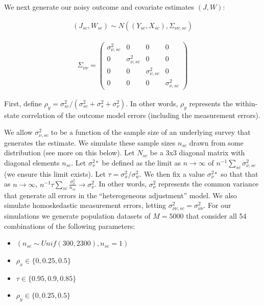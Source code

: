 We next generate our noisy outcome and covariate estimates $(J, W)$:

\begin{align*}
(J_{sc}, W_{sc}) \sim N((Y_{sc}, X_{sc}), \Sigma_{\nu\nu, sc})
\end{align*}

\begin{align*}
    \Sigma_{\nu\nu} = \begin{pmatrix}
    \sigma^2_{\nu, sc} & 0 & 0 & 0 \\
    0 & \sigma^2_{\nu, sc} & 0 & 0 \\
    0 & 0 & \sigma^2_{\nu, sc} & 0 \\
    0 & 0 & 0 & \sigma^2_{\nu, sc}
    \end{pmatrix}
\end{align*}

First, define $\rho_y = \sigma^2_{sc}/(\sigma^2_{sc} + \sigma^2_s + \sigma^2_{\nu})$. In other words, $\rho_y$ represents the within-state correlation of the outcome model errors (including the measurement errors).

We allow $\sigma^2_{\nu, sc}$ to be a function of the sample size of an underlying survey that generates the estimate. We simulate these sample sizes $n_{sc}$ drawn from some distribution (see more on this below). Let $N_{sc}$ be a 3x3 diagonal matrix with diagonal elements $n_{sc}$. Let $\sigma_{\nu}^{2\star}$ be defined as the limit as $n \to \infty$ of $n^{-1}\sum_{sc}\sigma^2_{\nu, sc}$ (we ensure this limit exists). Let $\tau = \sigma^2_x/\sigma^2_w$. We then fix a value $\sigma_{\nu}^{2\star}$ so that that as $n \to \infty$, $n^{-1} \tau \sum_{sc}\frac{\sigma^2_{\nu}}{n_{sc}} \to \sigma^2_{\nu}$. In other words, $\sigma_{\nu}^2$ represents the common variance that generate all errors in the ``heterogeneous adjustment'' model. We also simulate homoskedastic measurement errors, letting $\sigma^2_{\nu\nu, sc} = \sigma^2_{\nu\nu}$. 
For our simulations we generate population datasets of $M = 5000$ that consider all 54 combinations of the following parameters:

\begin{itemize}
    \item $(n_{sc} \sim Unif(300, 2300), n_{sc} = 1)$ 
    \item $\rho_x \in \{0, 0.25, 0.5\}$
    \item $\tau \in \{0.95, 0.9, 0.85\}$
    \item $\rho_y \in \{0, 0.25, 0.5\}$
\end{itemize}

